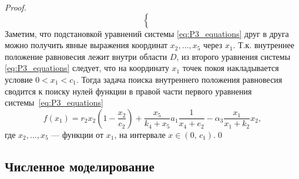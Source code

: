 \documentclass[14pt,a4paper]{extarticle}
\begin{document}
\begin{proof}
\begin{equation}
\begin{cases}
\begin{aligned}
				\end{aligned}
			\end{cases}
		\end{equation}
		Заметим, что подстановкой уравнений системы \ref{eq:P3_equations} друг в друга можно получить явные выражения координат $x_2,\ldots,x_5$ через $x_1$. Т.к. внутреннее положение равновесия лежит внутри области $D$, из второго уравнения системы \ref{eq:P3_equations} следует, что на координату $x_1$ точек покоя накладывается условие $0 < x_1 < c_1$. Тогда задача поиска внутреннего положения равновесия сводится к поиску нулей функции в правой части первого уравнения системы~\ref{eq:P3_equations}
		\[f(x_1)=r_2x_2\left(1-\dfrac{x_2}{c_2}\right)+\dfrac{x_5}{k_4+x_5}a_1\dfrac{1}{x_4+e_2}-\alpha_3\dfrac{x_1}{x_1+k_2}x_2,\]
		где $x_2,\ldots,x_5$ --- функции от $x_1$, на интервале $x\in\left(0,\, c_1\right)$.\qed
	\end{proof}
	
	\subsection{Численное моделирование}
	
\end{document}
